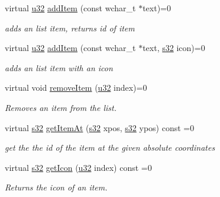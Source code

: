 \begin{DoxyCompactItemize}
virtual \hyperlink{namespaceirr_a0416a53257075833e7002efd0a18e804}{u32} \hyperlink{classirr_1_1gui_1_1IGUIListBox_a298dbba8da28248b563a906c520dc3be}{add\+Item} (const wchar\+\_\+t $\ast$text)=0
\begin{DoxyCompactList}\small\item\em adds an list item, returns id of item \end{DoxyCompactList}\item 
virtual \hyperlink{namespaceirr_a0416a53257075833e7002efd0a18e804}{u32} \hyperlink{classirr_1_1gui_1_1IGUIListBox_a2cfc2ff5f8f5114a92bd3618e79327e0}{add\+Item} (const wchar\+\_\+t $\ast$text, \hyperlink{namespaceirr_ac66849b7a6ed16e30ebede579f9b47c6}{s32} icon)=0
\begin{DoxyCompactList}\small\item\em adds an list item with an icon \end{DoxyCompactList}\item 
\mbox{\label{classirr_1_1gui_1_1IGUIListBox_a6c19c6db0bcf52756d9bb866063a770b}} 
virtual void \hyperlink{classirr_1_1gui_1_1IGUIListBox_a6c19c6db0bcf52756d9bb866063a770b}{remove\+Item} (\hyperlink{namespaceirr_a0416a53257075833e7002efd0a18e804}{u32} index)=0
\begin{DoxyCompactList}\small\item\em Removes an item from the list. \end{DoxyCompactList}\item 
virtual \hyperlink{namespaceirr_ac66849b7a6ed16e30ebede579f9b47c6}{s32} \hyperlink{classirr_1_1gui_1_1IGUIListBox_a8e1fe86805d9b970b89878291f0ccd25}{get\+Item\+At} (\hyperlink{namespaceirr_ac66849b7a6ed16e30ebede579f9b47c6}{s32} xpos, \hyperlink{namespaceirr_ac66849b7a6ed16e30ebede579f9b47c6}{s32} ypos) const =0
\begin{DoxyCompactList}\small\item\em get the the id of the item at the given absolute coordinates \end{DoxyCompactList}\item 
\mbox{\label{classirr_1_1gui_1_1IGUIListBox_a8e5f9751a7a1a32dde5a243733b3ddc6}} 
virtual \hyperlink{namespaceirr_ac66849b7a6ed16e30ebede579f9b47c6}{s32} \hyperlink{classirr_1_1gui_1_1IGUIListBox_a8e5f9751a7a1a32dde5a243733b3ddc6}{get\+Icon} (\hyperlink{namespaceirr_a0416a53257075833e7002efd0a18e804}{u32} index) const =0
\begin{DoxyCompactList}\small\item\em Returns the icon of an item. \end{DoxyCompactList}\item 

\end{DoxyCompactItemize}
